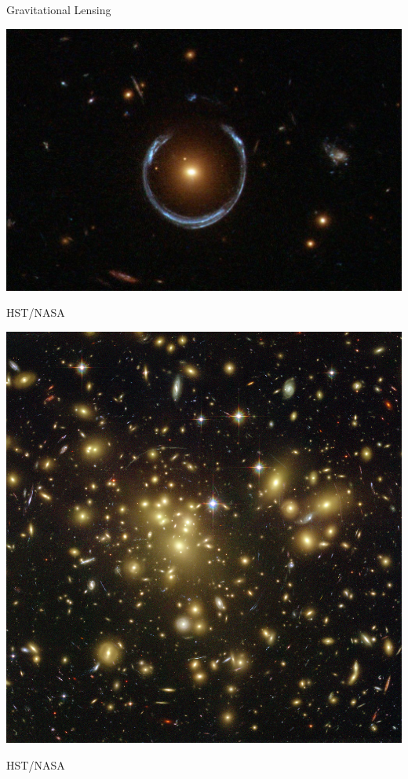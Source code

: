 \documentclass{beamer}
\begin{document}
\frame
{

    {\huge Gravitational Lensing}

}

\frame
{
            \begin{center}
                \includegraphics[width=\textwidth]{A_Horseshoe_Einstein_Ring_from_Hubble.JPG}
            \end{center}
            {\tiny HST/NASA}

    
}
\frame
{
            \begin{center}
                \includegraphics[height=\textheight]{abell-1689-hubble.jpg}
            \end{center}
            {\tiny HST/NASA}

    
}
\end{document}
